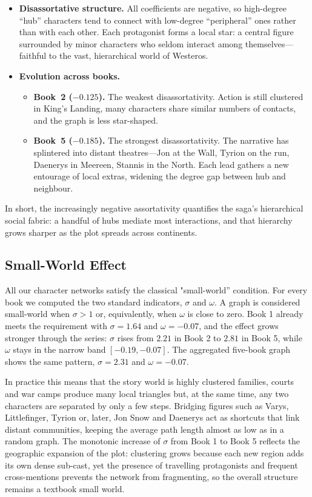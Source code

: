 \documentclass[12pt, a4paper]{article}
\begin{document}
\begin{itemize}
  \item \textbf{Disassortative structure.}  
        All coefficients are negative, so high-degree “hub” characters tend to connect with low-degree “peripheral” ones rather than with each other.  
        Each protagonist forms a local star: a central figure surrounded by minor characters who seldom interact among themselves—faithful to the vast, hierarchical world of Westeros.

  \item \textbf{Evolution across books.}
        \begin{itemize}
          \item \textbf{Book~2 (\(-0.125\)).}  
                The weakest disassortativity. Action is still clustered in King’s Landing, many characters share similar numbers of contacts, and the graph is less star-shaped.

          \item \textbf{Book~5 (\(-0.185\)).}  
                The strongest disassortativity. The narrative has splintered into distant theatres—Jon at the Wall, Tyrion on the run, Daenerys in Meereen, Stannis in the North.  
                Each lead gathers a new entourage of local extras, widening the degree gap between hub and neighbour.
        \end{itemize}
\end{itemize}

\medskip
In short, the increasingly negative assortativity quantifies the saga’s hierarchical social fabric: a handful of hubs mediate most interactions, and that hierarchy grows sharper as the plot spreads across continents.
\subsection*{Small-World Effect} 

All our character networks satisfy the classical "small-world'' condition.
For every book we computed the two standard indicators, 
$\sigma$ and $\omega$.
A graph is considered small-world when $\sigma>1$ or, equivalently, when $\omega$ is close to zero.
Book 1 already meets the requirement with $\sigma=1.64$ and $\omega=-0.07$, and the effect grows stronger through the series: $\sigma$ rises from $2.21$ in Book 2 to $2.81$ in Book 5, while $\omega$ stays in the narrow band $[-0.19,-0.07]$.
The aggregated five-book graph shows the same pattern, $\sigma=2.31$ and $\omega=-0.07$.

In practice this means that the story world is highly clustered families, 
courts and war camps produce many local triangles but, at the same time, 
any two characters are separated by only a few steps. 
Bridging figures such as Varys, Littlefinger, 
Tyrion or, later, Jon Snow and Daenerys act as 
shortcuts that link distant communities, keeping the average path length almost as low 
as in a random graph.  The monotonic increase of $\sigma$ from Book 1 to Book 5 reflects
 the geographic expansion of the plot: clustering grows because each new region adds its
  own dense sub-cast, yet the presence of travelling protagonists and frequent cross-mentions
   prevents the network from fragmenting, so the overall structure remains a textbook small world.
\end{document}
